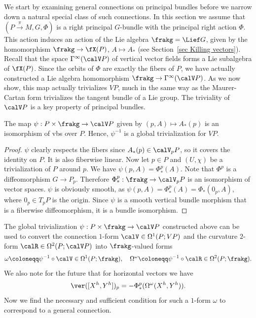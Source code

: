 We start by examining general connections on principal bundles before we narrow down a natural special class of such connections. In this section we assume that $(P\overset{\pi}{\to}M,G,\Phi)$ is a right principal $G$-bundle with the principal right action $\Phi$. This action induces an action of the Lie algebra $\frakg=\Lief G$, given by the homomorphism $\frakg\to \fX(P)$, $A\mapsto A_\ast$ (see Section~\ref{sec Killing vectors}). Recall that the space $\Gamma^\infty(\calV P)$ of vertical vector fields forms a Lie subalgebra of $\fX(P)$. Since the orbits of $\Phi$ are exactly the fibers of $P$, we have actually constructed a Lie algebra homomorphism $\frakg\to \Gamma^\infty(\calV P)$. As we now show, this map actually trivializes $VP$, much in the same way as the Maurer-Cartan form trivializes the tangent bundle of a Lie group. The triviality of $\calV P$ is a key property of principal bundles.

\begin{prop}[{{\cite[Lem.~1.3.1]{RS2}}}]\label{lem 1.3.1 RS2}
    The map $\psi:P\times\frakg\to \calV P$ given by $(p,A)\mapsto A_\ast(p)$ is an isomorphism of \glspl{vb} over $P$. Hence, $\psi^{-1}$ is a global trivialization for $VP$.
\end{prop}
\begin{proof}
    $\psi$ clearly respects the fibers since $A_\ast(p)\in \calV_pP$, so it covers the identity on $P$. It is also fiberwise linear. Now let $p\in P$ and $(U,\chi)$ be a trivialization of $P$ around $p$. We have $\psi(p,A)=\Phi^p_{\ast}(A)$. Note that $\Phi^p$ is a diffeomorphism $G\to P_p$. Therefore $\Phi^{p}_\ast:\frakg\to \calV_pP$ is an isomorphism of vector spaces. $\psi$ is obviously smooth, as $\psi(p,A)=\Phi^p_\ast(A)=\Phi_\ast(0_p,A)$, where $0_p\in T_pP$ is the origin. Since $\psi$ is a smooth vertical bundle morphism that is a fiberwise diffeomorphism, it is a bundle isomorphism.
\end{proof}


The global trivialization $\psi:P\times\frakg\to \calV P$ constructed above can be used to convert the connection $1$-form $\calV\in\Omega^1(P;VP)$ and the curvature $2$-form $\calR\in \Omega^2(P;\calV P)$ into $\frakg$-valued forms
 \[\omega\coloneqq \psi^{-1}\circ \calV \in\Omega^1(P;\frakg),\quad \Omega^\omega\coloneqq \psi^{-1}\circ \calR\in \Omega^2(P;\frakg).\]
We also note for the future that for horizontal vectors we have
\[\ver([X^h,Y^h])_p=-\Phi^p_\ast(\Omega^\omega(X^h,Y^h)).\label{eq 1.4.5 RS2}\]
Now we find the necessary and sufficient condition for such a $1$-form $\omega$ to correspond to a general connection.

